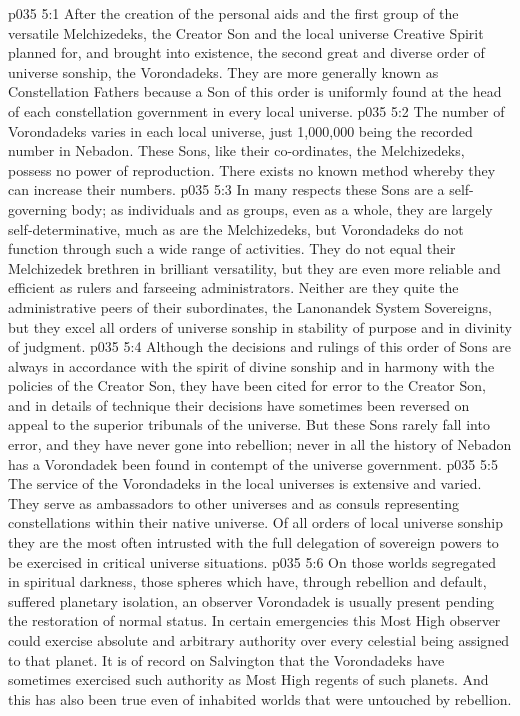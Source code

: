 \vs p035 5:1 After the creation of the personal aids and the first group of the versatile Melchizedeks, the Creator Son and the local universe Creative Spirit planned for, and brought into existence, the second great and diverse order of universe sonship, the Vorondadeks. They are more generally known as Constellation Fathers because a Son of this order is uniformly found at the head of each constellation government in every local universe.
\vs p035 5:2 \pc The number of Vorondadeks varies in each local universe, just 1,000,000 being the recorded number in Nebadon. These Sons, like their co\hyp{}ordinates, the Melchizedeks, possess no power of reproduction. There exists no known method whereby they can increase their numbers.
\vs p035 5:3 \pc In many respects these Sons are a self\hyp{}governing body; as individuals and as groups, even as a whole, they are largely self\hyp{}determinative, much as are the Melchizedeks, but Vorondadeks do not function through such a wide range of activities. They do not equal their Melchizedek brethren in brilliant versatility, but they are even more reliable and efficient as rulers and farseeing administrators. Neither are they quite the administrative peers of their subordinates, the Lanonandek System Sovereigns, but they excel all orders of universe sonship in stability of purpose and in divinity of judgment.
\vs p035 5:4 Although the decisions and rulings of this order of Sons are always in accordance with the spirit of divine sonship and in harmony with the policies of the Creator Son, they have been cited for error to the Creator Son, and in details of technique their decisions have sometimes been reversed on appeal to the superior tribunals of the universe. But these Sons rarely fall into error, and they have never gone into rebellion; never in all the history of Nebadon has a Vorondadek been found in contempt of the universe government.
\vs p035 5:5 The service of the Vorondadeks in the local universes is extensive and varied. They serve as ambassadors to other universes and as consuls representing constellations within their native universe. Of all orders of local universe sonship they are the most often intrusted with the full delegation of sovereign powers to be exercised in critical universe situations.
\vs p035 5:6 On those worlds segregated in spiritual darkness, those spheres which have, through rebellion and default, suffered planetary isolation, an observer Vorondadek is usually present pending the restoration of normal status. In certain emergencies this Most High observer could exercise absolute and arbitrary authority over every celestial being assigned to that planet. It is of record on Salvington that the Vorondadeks have sometimes exercised such authority as Most High regents of such planets. And this has also been true even of inhabited worlds that were untouched by rebellion.

